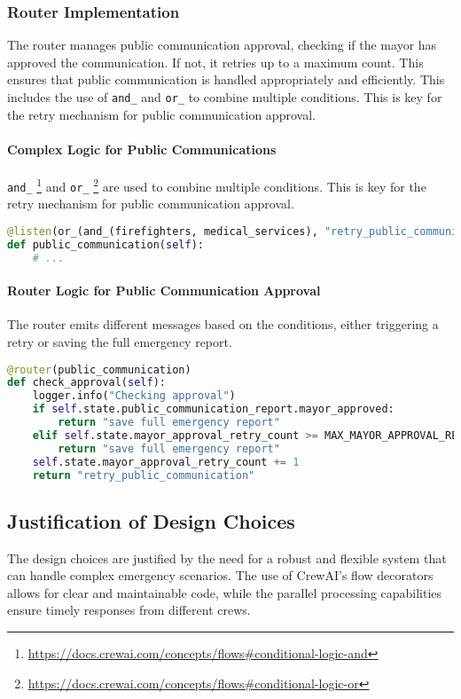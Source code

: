 \subsubsection{Router Implementation}
The router manages public communication approval, checking if the mayor has approved the communication. If not, it retries up to a maximum count. This ensures that public communication is handled appropriately and efficiently.
This includes the use of \texttt{and\_} and \texttt{or\_} to combine multiple conditions. This is key for the retry mechanism for public communication approval.

\paragraph{Complex Logic for Public Communications}
\texttt{and\_} \footnote{\url{https://docs.crewai.com/concepts/flows\#conditional-logic-and}} and \texttt{or\_} \footnote{\url{https://docs.crewai.com/concepts/flows\#conditional-logic-or}} are used to combine multiple conditions. This is key for the retry mechanism for public communication approval.

\begin{lstlisting}[language=Python]
@listen(or_(and_(firefighters, medical_services), "retry_public_communication"))
def public_communication(self):
    # ...
\end{lstlisting}

\paragraph{Router Logic for Public Communication Approval}
The router emits different messages based on the conditions, either triggering a retry or saving the full emergency report.

\begin{lstlisting}[language=Python]
@router(public_communication)
def check_approval(self):
    logger.info("Checking approval")
    if self.state.public_communication_report.mayor_approved:
        return "save full emergency report"
    elif self.state.mayor_approval_retry_count >= MAX_MAYOR_APPROVAL_RETRY_COUNT:
        return "save full emergency report"
    self.state.mayor_approval_retry_count += 1
    return "retry_public_communication"
\end{lstlisting}

\subsection{Justification of Design Choices}
The design choices are justified by the need for a robust and flexible system that can handle complex emergency scenarios. The use of CrewAI's flow decorators allows for clear and maintainable code, while the parallel processing capabilities ensure timely responses from different crews.
